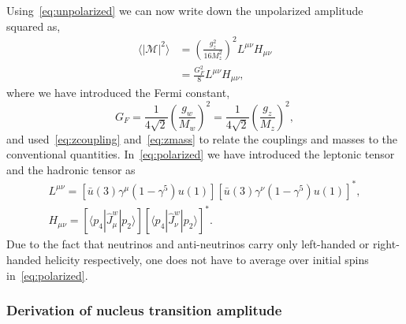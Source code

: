 Using~\eqref{eq:unpolarized} we can now write down the unpolarized amplitude squared as,
\begin{align}
\langle |\mathcal{M}|^2 \rangle &=\left( \frac{g_z^2}{16M_z^2} \right) ^2 L^{\mu \nu}H_{\mu \nu} \nonumber \\
&= \frac{G_F^2}{8} L^{\mu \nu}H_{\mu \nu}, \label{eq:polarized}
\end{align}
where we have introduced the Fermi constant,
\begin{equation}
G_F=\frac{1}{4\sqrt{2}}\left( \frac{g_w}{M_w}\right) ^2=\frac{1}{4\sqrt{2}}\left( \frac{g_z}{M_z}\right) ^2,
\end{equation}
and used~\eqref{eq:zcoupling} and~\eqref{eq:zmass} to relate the couplings and masses to the conventional quantities. In~\eqref{eq:polarized} we have introduced the leptonic tensor and the hadronic tensor as
\begin{gather}
L^{\mu \nu}= [\bar{u}(3)\gamma ^{\mu}(1-\gamma ^{5})u(1)][\bar{u}(3)\gamma ^{\nu}(1-\gamma ^{5})u(1)]^*, \label{eq:leptonic} \\
H_{\mu \nu}= [\langle p_4|\hat{J}_{\mu}^{w}|p_2 \rangle][\langle p_4|\hat{J}_{\nu}^{w}|p_2 \rangle]^*. \label{eq:hadronic}
\end{gather}
Due to the fact that neutrinos and anti-neutrinos carry only left-handed or right-handed helicity respectively, one does not have to average over initial spins in~\eqref{eq:polarized}.

\subsubsection{Derivation of nucleus transition amplitude}

